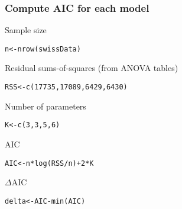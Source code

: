 \documentclass[color=usenames,dvipsnames]{beamer}\usepackage[]{graphicx}\usepackage[]{color}
\makeatletter
\newcommand{\hlnum}[1]{\textcolor[rgb]{0.69,0.494,0}{#1}}%
\newcommand{\hlopt}[1]{\textcolor[rgb]{0,0,0}{#1}}%
\newcommand{\hlstd}[1]{\textcolor[rgb]{0,0,0}{#1}}%
\newcommand{\hlkwb}[1]{\textcolor[rgb]{0,0.341,0.682}{#1}}%
\newcommand{\hlkwd}[1]{\textcolor[rgb]{0.004,0.004,0.506}{#1}}%
\newenvironment{kframe}{%
 \def\at@end@of@kframe{}%
 \ifinner\ifhmode%
  \def\at@end@of@kframe{\end{minipage}}%
  \begin{minipage}{\columnwidth}%
 \fi\fi%
 \def\FrameCommand##1{\hskip\@totalleftmargin \hskip-\fboxsep
 \colorbox{shadecolor}{##1}\hskip-\fboxsep
     \hskip-\linewidth \hskip-\@totalleftmargin \hskip\columnwidth}%
 \MakeFramed {\advance\hsize-\width
   \@totalleftmargin\z@ \linewidth\hsize
   \@setminipage}}%
 {\par\unskip\endMakeFramed%
 \at@end@of@kframe}
\newenvironment{knitrout}{}{} %
\makeatother
\begin{document}
\begin{frame}[fragile]
  \frametitle{Compute AIC for each model}
  {Sample size}
  \small
\begin{knitrout}
\color{fgcolor}\begin{kframe}
\begin{alltt}
\hlstd{n} \hlkwb{<-} \hlkwd{nrow}\hlstd{(swissData)}
\end{alltt}
\end{kframe}
\end{knitrout}
\pause
\vfill
{Residual sums-of-squares (from ANOVA tables)}
\begin{knitrout}
\color{fgcolor}\begin{kframe}
\begin{alltt}
\hlstd{RSS} \hlkwb{<-} \hlkwd{c}\hlstd{(}\hlnum{17735}\hlstd{,} \hlnum{17089}\hlstd{,} \hlnum{6429}\hlstd{,} \hlnum{6430}\hlstd{)}
\end{alltt}
\end{kframe}
\end{knitrout}
\pause
\vfill
{Number of parameters}
\begin{knitrout}
\color{fgcolor}\begin{kframe}
\begin{alltt}
\hlstd{K} \hlkwb{<-} \hlkwd{c}\hlstd{(}\hlnum{3}\hlstd{,} \hlnum{3}\hlstd{,} \hlnum{5}\hlstd{,} \hlnum{6}\hlstd{)}
\end{alltt}
\end{kframe}
\end{knitrout}
\pause
\vfill
{AIC}
\begin{knitrout}
\color{fgcolor}\begin{kframe}
\begin{alltt}
\hlstd{AIC} \hlkwb{<-} \hlstd{n}\hlopt{*}\hlkwd{log}\hlstd{(RSS}\hlopt{/}\hlstd{n)} \hlopt{+} \hlnum{2}\hlopt{*}\hlstd{K}
\end{alltt}
\end{kframe}
\end{knitrout}
\pause
\vfill
  {$\Delta$AIC}
\begin{knitrout}
\color{fgcolor}\begin{kframe}
\begin{alltt}
\hlstd{delta} \hlkwb{<-} \hlstd{AIC} \hlopt{-} \hlkwd{min}\hlstd{(AIC)}

\end{alltt}
\end{kframe}
\end{knitrout}
\end{frame}
\end{document}
